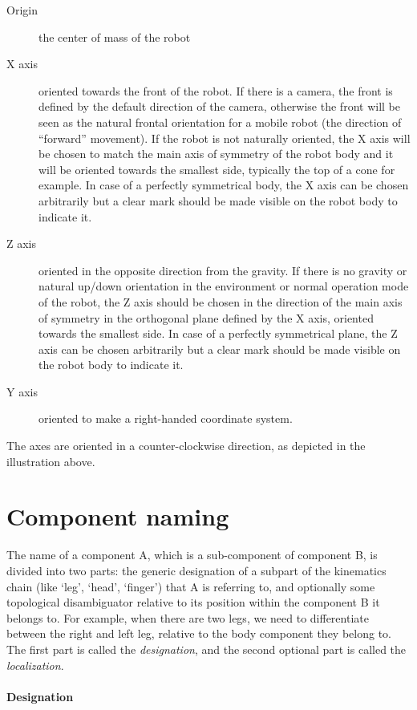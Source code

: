 \begin{description}
\item[Origin] the center of mass of the robot
\item[X axis] oriented towards the front of the
robot. If there is a camera, the front is defined by the default
direction of the camera, otherwise the front will be seen as the
natural frontal orientation for a mobile robot (the direction of
“forward” movement). If the robot is not naturally oriented, the X axis
will be chosen to match the main axis of symmetry of the robot body and
it will be oriented towards the smallest side, typically the top of a
cone for example. In case of a perfectly symmetrical body, the
X axis can be chosen arbitrarily but a clear mark should be made
visible on the robot body to indicate it.
\item[Z axis] oriented in the opposite direction
from the gravity. If there is no gravity or natural up/down orientation
in the environment or normal operation mode of the robot, the Z axis
should be chosen in the direction of the main axis of symmetry in the
orthogonal plane defined by the X axis, oriented towards the smallest
side. In case of a perfectly symmetrical plane, the Z axis can be
chosen arbitrarily but a clear mark should be made visible on the robot
body to indicate it.
\item[Y axis] oriented to make a right-handed
coordinate system.
\end{description}


The axes are oriented in a counter-clockwise direction, as depicted in
the illustration above.

\section{Component naming}

The name of a component A, which is a sub-component of component
B, is divided into two parts: the generic designation of a subpart of
the kinematics chain (like ‘leg’, ‘head’, ‘finger’) that A is referring
to, and optionally some topological disambiguator relative to its
position within the component B it belongs to. For example, when there
are two legs, we need to differentiate between the right and left leg,
relative to the body component they belong to. The first part is called
the \textit{designation}, and the second optional
part is called the \textit{localization}.

\paragraph{Designation}


